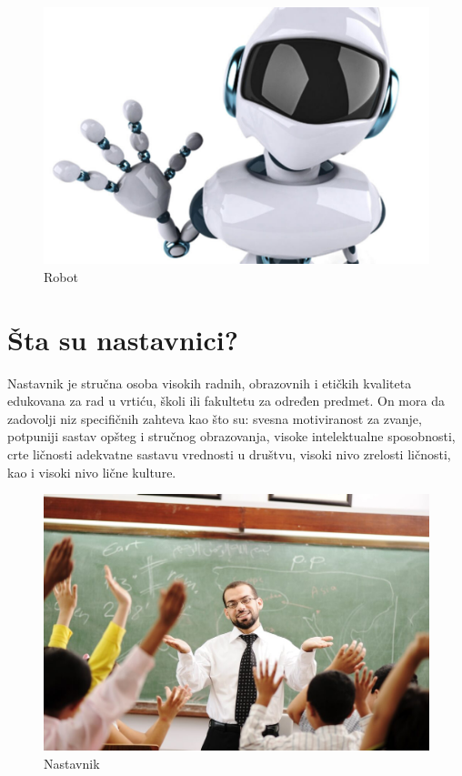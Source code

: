 \documentclass[a4paper]{article}
\begin{document}
\begin{figure}[h!]
\begin{center}
\includegraphics[scale=0.3]{robotm.jpg}
\caption{Robot}
\end{center}
\label{fig:robot}
\end{figure}

\newpage
\section{Šta su nastavnici?}
Nastavnik je stručna osoba visokih radnih, obrazovnih i etičkih kvaliteta edukovana za rad u vrtiću, školi ili fakultetu za određen predmet. On mora da zadovolji niz specifičnih zahteva kao što su: svesna motiviranost za zvanje, potpuniji sastav opšteg i stručnog obrazovanja, visoke intelektualne sposobnosti, crte ličnosti adekvatne sastavu vrednosti u društvu, visoki nivo zrelosti ličnosti, kao i visoki nivo lične kulture.

\begin{figure}[h!]
\begin{center}
\includegraphics[scale=1.2]{nastavnik.jpg}
\caption{Nastavnik}
\end{center}
\label{fig:nastavnik}
\end{figure}
\end{document}
